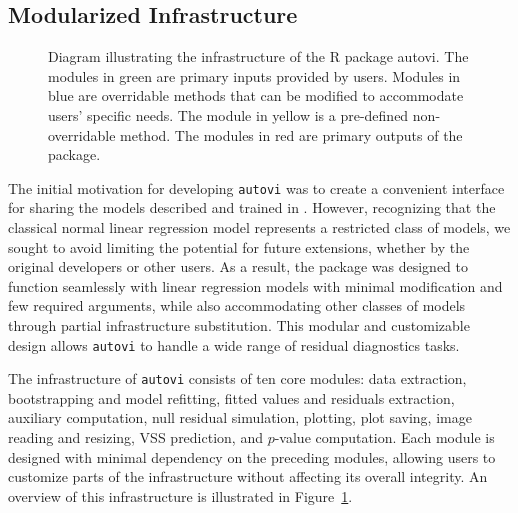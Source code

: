 \documentclass[
doublespace,
  times]{anzsauth}
\begin{document}
\subsection{Modularized Infrastructure}\label{sec-autovi-infrastructure}

\begin{figure}


\caption{\label{fig-autovi-diag}Diagram illustrating the infrastructure
of the R package autovi. The modules in green are primary inputs
provided by users. Modules in blue are overridable methods that can be
modified to accommodate users' specific needs. The module in yellow is a
pre-defined non-overridable method. The modules in red are primary
outputs of the package.}

\end{figure}%

The initial motivation for developing \texttt{autovi} was to create a
convenient interface for sharing the models described and trained in
\citet{li2024automated}. However, recognizing that the classical normal
linear regression model represents a restricted class of models, we
sought to avoid limiting the potential for future extensions, whether by
the original developers or other users. As a result, the package was
designed to function seamlessly with linear regression models with
minimal modification and few required arguments, while also
accommodating other classes of models through partial infrastructure
substitution. This modular and customizable design allows
\texttt{autovi} to handle a wide range of residual diagnostics tasks.

The infrastructure of \texttt{autovi} consists of ten core modules: data
extraction, bootstrapping and model refitting, fitted values and
residuals extraction, auxiliary computation, null residual simulation,
plotting, plot saving, image reading and resizing, VSS prediction, and
\(p\)-value computation. Each module is designed with minimal dependency
on the preceding modules, allowing users to customize parts of the
infrastructure without affecting its overall integrity. An overview of
this infrastructure is illustrated in Figure~\ref{fig-autovi-diag}.
\end{document}
